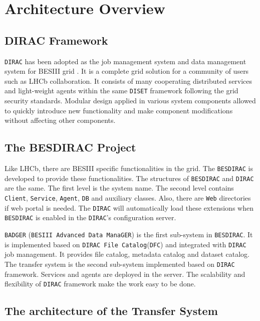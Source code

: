 \section{Architecture Overview}

\subsection{DIRAC Framework}

{\tt DIRAC} \cite{bib:dirac3,bib:diracgit} 
has been adopted as the job management system and data management
system for BESIII grid \cite{bib:besdfc}. 
It is a complete grid solution for a community of users such as
LHCb collaboration.
It consists of many cooperating distributed services and light-weight
agents within the same {\tt DISET} framework following the grid
security standards.
Modular design applied in various system components allowed to quickly
introduce new functionality and make component modifications without
affecting other components.

\subsection{The BESDIRAC Project}

Like LHCb, there are BESIII specific functionalities in the grid.
The {\tt BESDIRAC} \cite{bib:besdirac} 
is developed to provide these functionalities.
The structures of {\tt BESDIRAC} and {\tt DIRAC} are the same.
The first level is the system name. The second level contains
{\tt Client}, {\tt Service}, {\tt Agent}, {\tt DB} and auxiliary classes.
Also, there are {\tt Web} directories if web portal is needed.
The {\tt DIRAC} will automatically load these extensions when 
{\tt BESDIRAC} is enabled in the {\tt DIRAC}'s configuration server.

{\tt BADGER} (\verb"BESIII Advanced Data ManaGER") is the first sub-system
in {\tt BESDIRAC}. It is implemented based on {\tt DIRAC File
Catalog}(\verb"DFC")
and integrated with {\tt DIRAC} job management.
It provides file catalog, metadata catalog and dataset catalog.
%
The transfer system is the second sub-system implemented based on
{\tt DIRAC} framework. Services and agents are deployed in the server.
The scalability and flexibility of {\tt DIRAC} framework make the work
easy to be done. 

\subsection{The architecture of the Transfer System}

